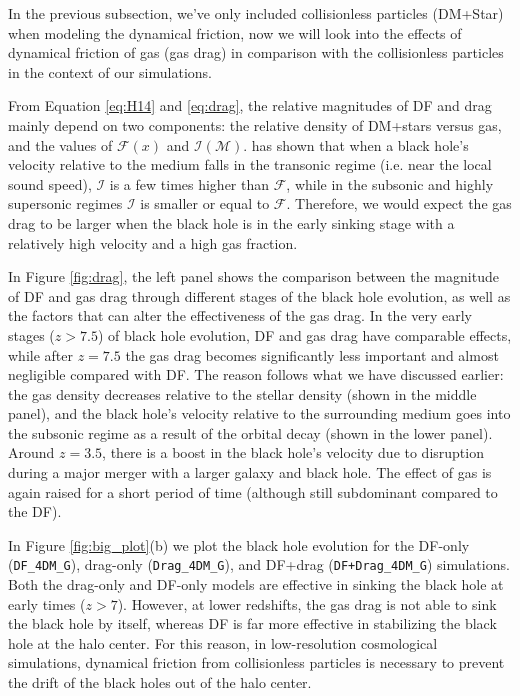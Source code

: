 In the previous subsection, we've only included collisionless particles (DM+Star) when modeling the dynamical friction, now we will look into the effects of dynamical friction of gas (gas drag) in comparison with the collisionless particles in the context of our simulations.

From Equation \ref{eq:H14} and \ref{eq:drag}, the relative magnitudes of DF and drag mainly depend on two components: the relative density of DM+stars versus gas, and the values of $\mathcal{F}(x)$ and $\mathcal{I(M)}$. \cite{Ostriker1999} has shown that when a black hole's velocity relative to the medium falls in the transonic regime (i.e. near the local sound speed), $\mathcal{I}$ is a few times higher than $\mathcal{F}$, while in the subsonic and highly supersonic regimes $\mathcal{I}$ is smaller or equal to $\mathcal{F}$. Therefore, we would expect the gas drag to be larger when the black hole is in the early sinking stage with a relatively high velocity and a high gas fraction. 

In Figure \ref{fig:drag}, the left panel shows the comparison between the magnitude of DF and gas drag through different stages of the black hole evolution, as well as the factors that can alter the effectiveness of the gas drag. In the very early stages ($z>7.5$) of black hole evolution, DF and gas drag have comparable effects, while after $z=7.5$ the gas drag becomes significantly less important and almost negligible compared with DF. The reason follows what we have discussed earlier: the gas density decreases relative to the stellar density (shown in the middle panel), and the black hole's velocity relative to the surrounding medium goes into the subsonic regime as a result of the orbital decay (shown in the lower panel). Around $z=3.5$, there is a boost in the black hole's velocity due to disruption during a major merger with a larger galaxy and black hole. The effect of gas is again raised for a short period of time (although still subdominant compared to the DF).

In Figure \ref{fig:big_plot}(b) we plot the black hole evolution for the DF-only (\texttt{DF\_4DM\_G}), drag-only (\texttt{Drag\_4DM\_G}), and DF+drag (\texttt{DF+Drag\_4DM\_G}) simulations.
Both the drag-only and DF-only models are effective in sinking the black hole at early times ($z>7$). However, at lower redshifts, the gas drag is not able to sink the black hole by itself, whereas DF is far more effective in stabilizing the black hole at the halo center. For this reason, in low-resolution cosmological simulations, dynamical friction from collisionless particles is necessary to prevent the drift of the black holes out of the halo center.

